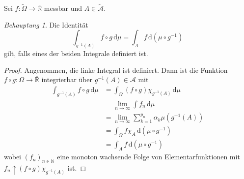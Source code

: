 \documentclass[draft,a5paper]{article}
\theoremstyle{remark}
\newtheorem*{Behauptung}{Behauptung}
\newcommand{\wt}{\widetilde}
\newcommand{\dd}{\,\mathrm{d}}
\begin{document}
Sei \(f \colon \wt{\Omega} \to \overline{\mathbb{R}}\) messbar und \(A \in \wt{\mathcal{A}}\).
\begin{Behauptung}
  Die Identität
  \[\int_{g^{-1}(A)} f \circ g \dd \mu = \int_{A} f \dd(\mu \circ g^{-1})\]
  gilt, falls eines der beiden Integrale definiert ist.
\end{Behauptung}
\begin{proof}
  Angenommen, die linke Integral ist definiert.  Dann ist die Funktion
  \(f \circ g\colon \Omega \to \overline{\mathbb{R}}\) integrierbar über \(g^{-1}(A) \in \mathcal{A}\) mit
  \begin{align*}
    \int_{g^{-1}(A)} f \circ g \dd \mu
    &= \int_{\Omega}{(f \circ g) \chi_{g^{-1}(A)} \dd \mu} \\
    &= \lim_{n \to \infty}{\int{f_{n}}\dd\mu} \\
    &=\lim_{n \to \infty}\sum_{k=1}^{p_{n}}{\alpha_{k}\mu(g^{-1}(A))}  \\
    &= \int_{\Omega} f \chi_{A} \dd(\mu \circ g^{-1}) \\
    &= \int_{A}{f \dd(\mu \circ g^{-1})}
  \end{align*}
wobei
  \((f_{n})_{n \in \mathbb{N}}\) eine monoton wachsende Folge von
  Elementarfunktionen mit \(f_{n} \uparrow (f \circ g) \chi_{g^{-1}(A)}\) ist.
\end{proof}
\end{document}
